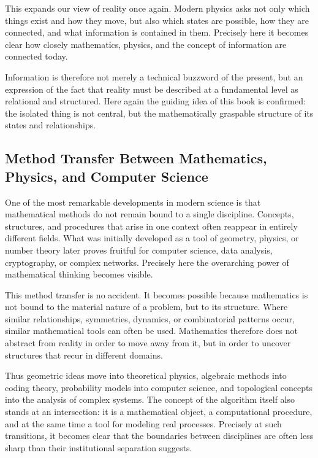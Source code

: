 This expands our view of reality once again.
Modern physics asks not only
which things exist and how they move,
but also
which states are possible,
how they are connected,
and what information is contained in them.
Precisely here it becomes clear
how closely mathematics,
physics,
and the concept of information
are connected today.

Information is therefore not merely a technical buzzword of the present,
but an expression of the fact
that reality must be described at a fundamental level
as relational and structured.
Here again the guiding idea of this book is confirmed:
the isolated thing is not central,
but the mathematically graspable structure
of its states and relationships.


\subsection{Method Transfer Between Mathematics,  \newline Physics, and Computer Science}

One of the most remarkable developments in modern science
is that mathematical methods do not remain bound to a single discipline.
Concepts, structures, and procedures
that arise in one context
often reappear in entirely different fields.
What was initially developed as a tool of geometry,
physics,
or number theory
later proves fruitful for computer science,
data analysis,
cryptography,
or complex networks.
Precisely here the overarching power of mathematical thinking becomes visible.

This method transfer is no accident.
It becomes possible
because mathematics is not bound to the material nature of a problem,
but to its structure.
Where similar relationships,
symmetries,
dynamics,
or combinatorial patterns occur,
similar mathematical tools can often be used.
Mathematics therefore does not abstract from reality
in order to move away from it,
but in order to uncover structures
that recur in different domains.

Thus geometric ideas move into theoretical physics,
algebraic methods into coding theory,
probability models into computer science,
and topological concepts into the analysis of complex systems.
The concept of the algorithm itself also stands at an intersection:
it is a mathematical object,
a computational procedure,
and at the same time a tool for modeling real processes.
Precisely at such transitions,
it becomes clear
that the boundaries between disciplines
are often less sharp
than their institutional separation suggests.

